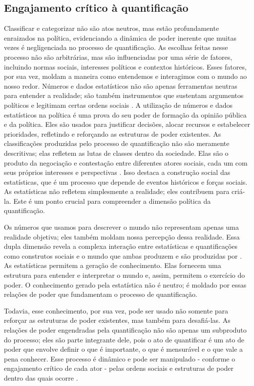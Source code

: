\subsection{Engajamento crítico à quantificação}

Classificar e categorizar não são atos neutros, mas estão profundamente enraizados na política, evidenciando a dinâmica de poder inerente que muitas vezes é negligenciada no processo de quantificação. As escolhas feitas nesse processo não são arbitrárias, mas são influenciadas por uma série de fatores, incluindo normas sociais, interesses políticos e contextos históricos. Esses fatores, por sua vez, moldam a maneira como entendemos e interagimos com o mundo ao nosso redor. Números e dados estatísticos não são apenas ferramentas neutras para entender a realidade; são também instrumentos que sustentam argumentos políticos e legitimam certas ordens sociais \cite{chun2021logic}. A utilização de números e dados estatísticos na política é uma prova do seu poder de formação da opinião pública e da política. Eles são usados para justificar decisões, alocar recursos e estabelecer prioridades, refletindo e reforçando as estruturas de poder existentes. As classificações produzidas pelo processo de quantificação não são meramente descritivas; elas refletem as lutas de classes dentro da sociedade. Elas são o produto da negociação e contestação entre diferentes atores sociais, cada um com seus próprios interesses e perspectivas \cite{berman2018sociology}. Isso destaca a construção social das estatísticas, que é um processo que depende de eventos históricos e forças sociais. As estatísticas não refletem simplesmente a realidade; eles contribuem para criá-la. Este é um ponto crucial para compreender a dimensão política da quantificação. 

Os números que usamos para descrever o mundo não representam apenas uma realidade objetiva; eles também moldam nossa percepção dessa realidade. Essa dupla dimensão revela a complexa interação entre estatísticas e quantificações como construtos sociais e o mundo que ambas produzem e são produzidas por \cite{desrosieres1998politics}. As estatísticas permitem a geração de conhecimento. Elas fornecem uma estrutura para entender e interpretar o mundo e, assim, permitem o exercício do poder. O conhecimento gerado pela estatística não é neutro; é moldado por essas relações de poder que fundamentam o processo de quantificação.

Todavia, esse conhecimento, por sua vez, pode ser usado não somente para reforçar as estruturas de poder existentes, mas também para desafiá-las. As relações de poder engendradas pela quantificação não são apenas um subproduto do processo; eles são parte integrante dele, pois o ato de quantificar é um ato de poder que envolve definir o que é importante, o que é mensurável e o que vale a pena conhecer. Esse processo é dinâmico e pode ser manipulado - conforme o engajamento crítico de cada ator - pelas ordens sociais e estruturas de poder dentro das quais ocorre \cite{espeland2008sociology}.

